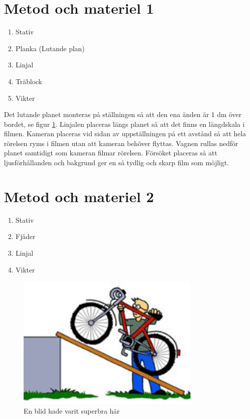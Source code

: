 \documentclass[11p, titlepage, oneside, a4paper]{article}
\begin{document}
	\section{Metod och materiel 1}
        \begin{enumerate}
            \item Stativ
            \item Planka (Lutande plan)
            \item Linjal
            \item Träblock
            \item Vikter
        \end{enumerate}

Det lutande planet monteras på ställningen så att den ena änden är 1 dm över bordet, se figur \ref{fig:lutandeplan}. Linjalen placeras längs planet så att det finns en längdskala  i filmen. Kameran placeras vid sidan av uppställningen på ett avstånd så att hela rörelsen ryms i filmen utan att kameran behöver flyttas. Vagnen rullas nedför planet samtidigt som kameran filmar rörelsen. Försöket placeras så att ljusförhållanden och bakgrund ger en så tydlig och skarp film som möjligt.

	\section{Metod och materiel 2}
        \begin{enumerate}
            \item Stativ
            \item Fjäder
            \item Linjal
            \item Vikter
        \end{enumerate}

        

        
        \begin{figure}[!h]
            \includegraphics[width=0.8\textwidth]{images/lutandePlan.jpg}
            \caption{En blid hade varit superbra här}
            \label{fig:lutandeplan}
        \end{figure}
        
\end{document}

